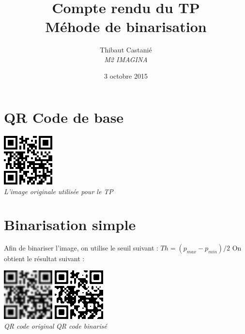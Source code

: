 \documentclass[a4paper,11pt]{article}
\begin{document}
\title{\textbf{Compte rendu du TP }\\Méhode de binarisation}
\author{Thibaut Castanié\\\textit{M2 IMAGINA}}
\date{3 octobre 2015}

\maketitle
\thispagestyle{empty}

\newpage 

\section{QR Code de base}

\vspace{1cm}

\begin{center}
\includegraphics[scale=0.5]{./v2.png}\\
\textit{L'image originale utilisée pour le TP}
\end{center}

\section{Binarisation simple}

Afin de binariser l'image, on utilise le seuil suivant : $Th=(p_{max}-p_{min})/2$
On obtient le résultat suivant :

\begin{center}
\includegraphics[scale=0.5]{./v2_4x4.png} \hspace{3cm}
\includegraphics[scale=0.5]{./v2_4x4binarise.png}\\
\textit{QR code original} \hspace{2cm} \textit{QR code binarisé}
\end{center}
\end{document}
